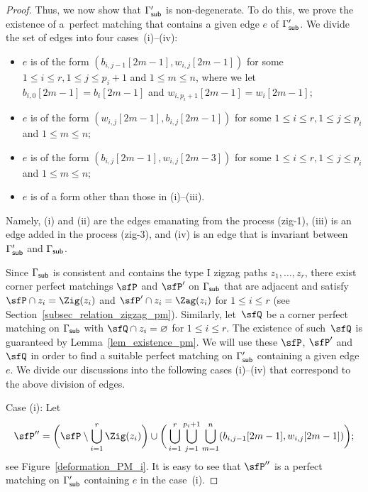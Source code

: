 \begin{proof}
Thus, we now show that $\Gamma^\prime_{\sf sub}$ is non-degenerate.
To do this, we prove the existence of a~perfect matching that contains a given edge $e$ of $\Gamma^\prime_{\sf sub}$.
We divide the set of edges into four cases~(i)--(iv):
\begin{itemize}\itemsep=0pt
\item[(i)] $e$ is of the form $(b_{i,j-1}[2m-1], w_{i,j}[2m-1])$ for some $1 \leq i \leq r, 1 \leq j \leq p_i+1$ and $1 \leq m \leq n$,
where we let $b_{i,0}[2m-1]=b_i[2m-1]$ and $w_{i,p_i+1}[2m-1]=w_i[2m-1]$;
\item[(ii)] $e$ is of the form $(w_{i,j}[2m-1], b_{i,j}[2m-1])$ for some $1 \leq i \leq r, 1 \leq j \leq p_i$ and $1 \leq m \leq n$;
\item[(iii)] $e$ is of the form $(b_{i,j}[2m-1],w_{i,j}[2m-3])$ for some $1 \leq i \leq r, 1 \leq j \leq p_i$ and $1 \leq m \leq n$;
\item[(iv)] $e$ is of a form other than those in (i)--(iii).
\end{itemize}
Namely, (i) and (ii) are the edges emanating from the process (zig-1), (iii) is an edge added in the process (zig-3), and (iv) is an edge that is invariant between $\Gamma^\prime_{\sf sub}$ and $\Gamma_{\sf sub}$.

Since $\Gamma_{\sf sub}$ is consistent and contains the type I zigzag paths $z_1,\dots,z_r$,
there exist corner perfect matchings $\sfP$ and $\sfP^\prime$ on $\Gamma_{\sf sub}$ that are adjacent and satisfy $\sfP \cap z_i=\Zig(z_i)$ and $\sfP^\prime \cap z_i=\Zag(z_i)$ for $1 \leq i \leq r$ (see Section~\ref{subsec_relation_zigzag_pm}).
Similarly, let~$\sfQ$ be a corner perfect matching on $\Gamma_{\sf sub}$ with $\sfQ \cap z_i = \varnothing$ for $1 \leq i \leq r$.
The existence of such~$\sfQ$ is guaranteed by Lemma~\ref{lem_existence_pm}.
We will use these $\sfP$, $\sfP^\prime$ and $\sfQ$ in order to find a suitable perfect matching on $\Gamma^\prime_{\sf sub}$ containing a given edge $e$.
We divide our discussions into the following cases (i)--(iv) that correspond to the above division of edges.

Case (i): Let \begin{gather}\label{PM_case(i)}
\sfP^{\prime\prime}=\bigg(\sfP \setminus \bigcup_{i=1}^r \Zig(z_i)\bigg) \cup \bigg(\bigcup_{i=1}^r \bigcup_{j=1}^{p_i+1} \bigcup_{m=1}^n(b_{i,j-1}[2m-1],w_{i,j}[2m-1])\bigg);
\end{gather}
see Figure~\ref{deformation_PM_i}. It is easy to see that $\sfP^{\prime\prime}$ is a perfect matching on $\Gamma^\prime_{\sf sub}$ containing $e$ in the case~(i).


\end{proof}
